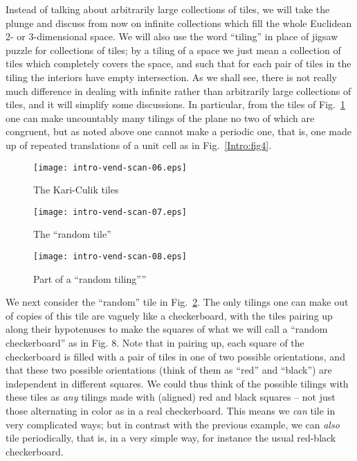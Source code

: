 \documentclass[reqno]{stml-l}
\theoremstyle{plain}
\theoremstyle{definition}
\numberwithin{equation}{chapter}
\begin{document}
Instead of talking about arbitrarily large collections of tiles, we will take the plunge and discuss from now on infinite collections which fill the whole Euclidean 2- or 3-dimensional space. We will also use the word ``tiling'' in place of jigsaw puzzle for collections of tiles; by a tiling of a space we just mean a collection of tiles which completely covers the space, and such that for each pair of tiles in the tiling the interiors have empty intersection. As we shall see, there is not really much difference in dealing with infinite rather than arbitrarily large collections of tiles, and it will simplify some discussions. In particular, from the tiles of Fig.~\ref{Intro:fig6} one can make uncountably many tilings of the plane no two of which are congruent, but as noted above one cannot make a periodic one, that is, one made up of repeated translations of a unit cell as in Fig.~\ref{Intro:fig4}.

\begin{figure}[!h]
\texttt{[image: intro-vend-scan-06.eps]}
\caption{The Kari-Culik tiles}\label{Intro:fig6}
\end{figure}

\begin{figure}[!h]
\texttt{[image: intro-vend-scan-07.eps]}
\caption{The ``random tile''}\label{Intro:fig7}
\end{figure}



\begin{figure}[!h]
\texttt{[image: intro-vend-scan-08.eps]}
\caption{Part of a ``random tiling''''}\label{Intro:fig}
\end{figure}

We next consider the ``random'' tile in Fig.~\ref{Intro:fig7}. The only tilings one can make out of copies of this tile are vaguely like a checkerboard, with the tiles pairing up along their hypotenuses to make the squares of what we will call a ``random checkerboard'' as in Fig. 8. Note that in pairing up, each square of the checkerboard is filled with a pair of tiles in one of two possible orientations, and that these two possible orientations (think of them as ``red'' and ``black'') are independent in different squares. We could thus think of the possible tilings with these tiles as \emph{any} tilings made with (aligned) red and black squares --
not just those alternating in color as in a real checkerboard. This means we \emph{can} tile in very complicated ways; but in contrast with the previous example, we can \emph{also} tile periodically, that is, in a very simple way, for instance the usual red-black checkerboard.
\end{document}
